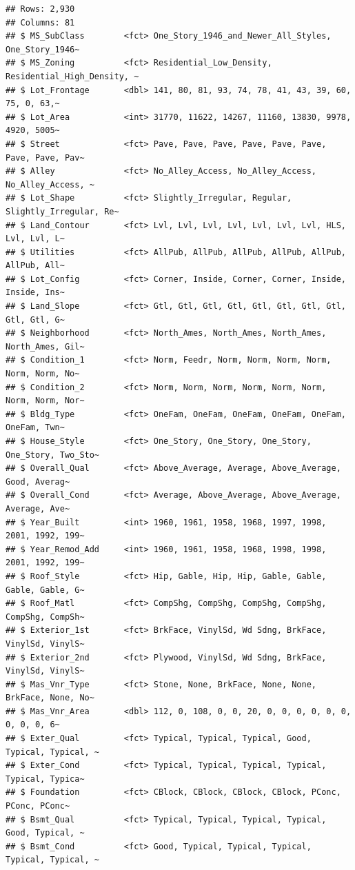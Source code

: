 \documentclass[
]{book}
\begin{document}
\begin{verbatim}
## Rows: 2,930
## Columns: 81
## $ MS_SubClass        <fct> One_Story_1946_and_Newer_All_Styles, One_Story_1946~
## $ MS_Zoning          <fct> Residential_Low_Density, Residential_High_Density, ~
## $ Lot_Frontage       <dbl> 141, 80, 81, 93, 74, 78, 41, 43, 39, 60, 75, 0, 63,~
## $ Lot_Area           <int> 31770, 11622, 14267, 11160, 13830, 9978, 4920, 5005~
## $ Street             <fct> Pave, Pave, Pave, Pave, Pave, Pave, Pave, Pave, Pav~
## $ Alley              <fct> No_Alley_Access, No_Alley_Access, No_Alley_Access, ~
## $ Lot_Shape          <fct> Slightly_Irregular, Regular, Slightly_Irregular, Re~
## $ Land_Contour       <fct> Lvl, Lvl, Lvl, Lvl, Lvl, Lvl, Lvl, HLS, Lvl, Lvl, L~
## $ Utilities          <fct> AllPub, AllPub, AllPub, AllPub, AllPub, AllPub, All~
## $ Lot_Config         <fct> Corner, Inside, Corner, Corner, Inside, Inside, Ins~
## $ Land_Slope         <fct> Gtl, Gtl, Gtl, Gtl, Gtl, Gtl, Gtl, Gtl, Gtl, Gtl, G~
## $ Neighborhood       <fct> North_Ames, North_Ames, North_Ames, North_Ames, Gil~
## $ Condition_1        <fct> Norm, Feedr, Norm, Norm, Norm, Norm, Norm, Norm, No~
## $ Condition_2        <fct> Norm, Norm, Norm, Norm, Norm, Norm, Norm, Norm, Nor~
## $ Bldg_Type          <fct> OneFam, OneFam, OneFam, OneFam, OneFam, OneFam, Twn~
## $ House_Style        <fct> One_Story, One_Story, One_Story, One_Story, Two_Sto~
## $ Overall_Qual       <fct> Above_Average, Average, Above_Average, Good, Averag~
## $ Overall_Cond       <fct> Average, Above_Average, Above_Average, Average, Ave~
## $ Year_Built         <int> 1960, 1961, 1958, 1968, 1997, 1998, 2001, 1992, 199~
## $ Year_Remod_Add     <int> 1960, 1961, 1958, 1968, 1998, 1998, 2001, 1992, 199~
## $ Roof_Style         <fct> Hip, Gable, Hip, Hip, Gable, Gable, Gable, Gable, G~
## $ Roof_Matl          <fct> CompShg, CompShg, CompShg, CompShg, CompShg, CompSh~
## $ Exterior_1st       <fct> BrkFace, VinylSd, Wd Sdng, BrkFace, VinylSd, VinylS~
## $ Exterior_2nd       <fct> Plywood, VinylSd, Wd Sdng, BrkFace, VinylSd, VinylS~
## $ Mas_Vnr_Type       <fct> Stone, None, BrkFace, None, None, BrkFace, None, No~
## $ Mas_Vnr_Area       <dbl> 112, 0, 108, 0, 0, 20, 0, 0, 0, 0, 0, 0, 0, 0, 0, 6~
## $ Exter_Qual         <fct> Typical, Typical, Typical, Good, Typical, Typical, ~
## $ Exter_Cond         <fct> Typical, Typical, Typical, Typical, Typical, Typica~
## $ Foundation         <fct> CBlock, CBlock, CBlock, CBlock, PConc, PConc, PConc~
## $ Bsmt_Qual          <fct> Typical, Typical, Typical, Typical, Good, Typical, ~
## $ Bsmt_Cond          <fct> Good, Typical, Typical, Typical, Typical, Typical, ~

\end{verbatim}
\end{document}
